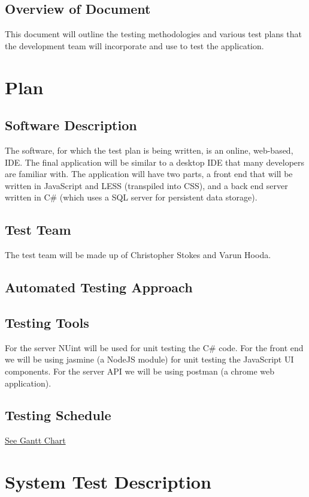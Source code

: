 \documentclass[12pt, titlepage]{article}
\begin{document}
\subsection{Overview of Document}
This document will outline the testing methodologies and various test plans
that the development team will incorporate and use to test the application.

\section{Plan}
	
\subsection{Software Description}
The software, for which the test plan is being written, is an online, web-based,
IDE. The final application will be similar to a
desktop IDE that many developers are familiar with. The application will have
two parts, a front end that will be written in JavaScript and LESS (transpiled
into CSS), and a back end server written in C\# (which uses a SQL server for
persistent data storage).

\subsection{Test Team}
The test team will be made up of Christopher Stokes and Varun Hooda.

\subsection{Automated Testing Approach}

\subsection{Testing Tools}
For the server NUint will be used for unit testing the C\# code.
For the front end we will be using jasmine (a NodeJS module) for unit testing
the JavaScript UI components.
For the server API we will be using postman (a chrome web application).

\subsection{Testing Schedule}
		
\href{../ProjectSchedule/schedule.png}{See Gantt Chart}

\section{System Test Description}
	
\end{document}
